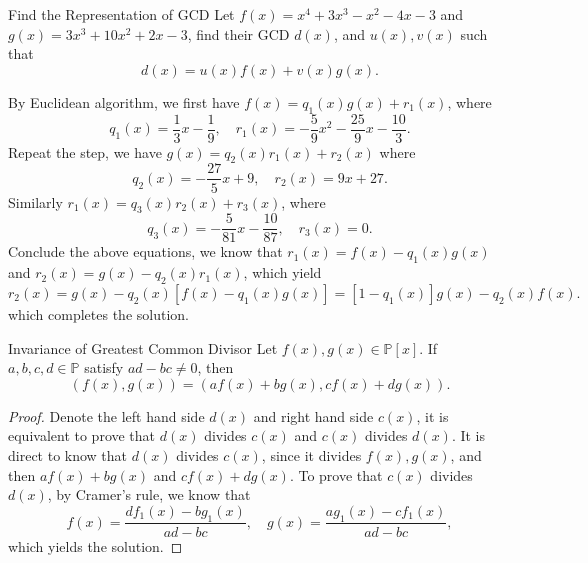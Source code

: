 \begin{example}{Find the Representation of GCD}{}
  Let $f(x) = x^4 + 3x^3 - x^2 - 4x - 3$ and $g(x) = 3x^3 + 10x^2 + 2x - 3$,
  find their GCD $d(x)$, and $u(x), v(x)$ such that
  \begin{equation}
    d(x) = u(x)f(x) + v(x) g(x).
  \end{equation}
\end{example}

\begin{solution}
  By Euclidean algorithm, we first have
  $f(x) = q_1(x)g(x) + r_1(x)$, where
  \begin{equation}
    q_1(x) = \frac{1}{3}x - \frac{1}{9}, \quad
    r_1(x) = - \frac{5}{9}x^2 - \frac{25}{9}x - \frac{10}{3}.
  \end{equation}
  Repeat the step, we have $g(x) = q_2(x)r_1(x) + r_2(x)$ where
  \begin{equation}
    q_2(x) = - \frac{27}{5}x + 9, \quad
    r_2(x) = 9x + 27.
  \end{equation}
  Similarly $r_1(x) = q_3(x)r_2(x) + r_3(x)$, where
  \begin{equation}
    q_3(x) = - \frac{5}{81}x - \frac{10}{87}, \quad
    r_3(x) = 0.
  \end{equation}
  Conclude the above equations, we know that $r_1(x) = f(x) - q_1(x)g(x)$ and
  $r_2(x) = g(x) - q_2(x)r_1(x)$, which yield
  \begin{equation}
    r_2(x) = g(x) - q_2(x)[f(x) - q_1(x)g(x)]
    = [1 - q_1(x)]g(x) - q_2(x)f(x).
  \end{equation}
  which completes the solution.
\end{solution}

\begin{proposition}{Invariance of Greatest Common Divisor}{}
  Let $f(x), g(x) \in \mathbb{P}[x]$. If $a,b,c,d \in \mathbb{P}$ satisfy $ad-bc
  \neq 0$, then
  \begin{equation}
    \left( f(x), g(x) \right) = (af(x) + bg(x), cf(x) + dg(x)).
  \end{equation}
\end{proposition}

\begin{proof}
  Denote the left hand side $d(x)$ and right hand side $c(x)$,
  it is equivalent to prove that $d(x)$ divides $c(x)$ and $c(x)$ divides $d(x)$.
  It is direct to know that $d(x)$ divides $c(x)$, since it divides $f(x),
  g(x)$, and then $af(x) + bg(x)$ and $cf(x) + dg(x)$.
  To prove that $c(x)$ divides $d(x)$, by Cramer's rule, we know that
  \begin{equation}
    f(x) = \frac{df_1(x) - bg_1(x)}{ad - bc}, \quad
    g(x) = \frac{ag_1(x) - cf_1(x)}{ad - bc},
  \end{equation}
  which yields the solution.
\end{proof}

